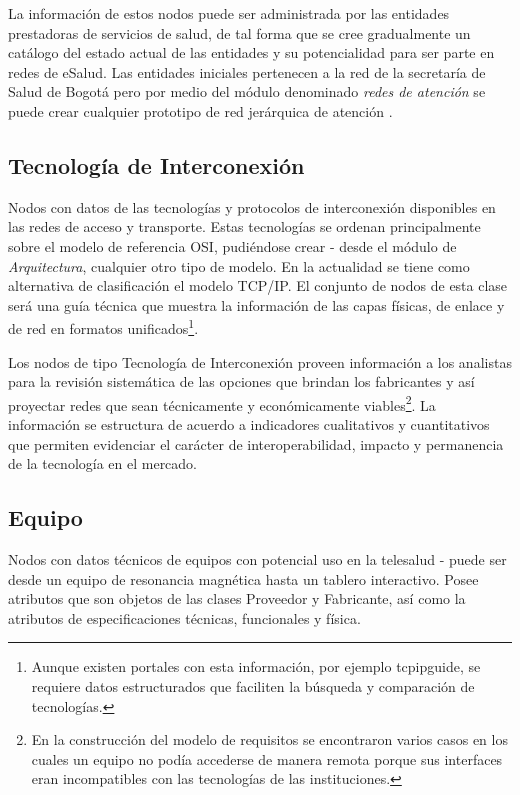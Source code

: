 La información de estos nodos puede ser administrada por las entidades prestadoras de servicios de salud, de tal forma que se cree gradualmente un catálogo del estado actual de las entidades y su potencialidad para ser parte en redes de eSalud. Las entidades iniciales pertenecen a la red de la secretaría de Salud de Bogotá pero por medio del módulo denominado \textit{redes de atención} se puede crear cualquier prototipo de red jerárquica de atención \cite{yellowlees}.

\subsection{Tecnología de Interconexión} 
Nodos con datos de las tecnologías y protocolos de interconexión disponibles en las redes de acceso y transporte. Estas tecnologías se ordenan principalmente sobre el modelo de referencia OSI, pudiéndose crear  - desde el módulo de \textit{Arquitectura}, cualquier otro tipo de modelo. En la actualidad se tiene como alternativa de clasificación el modelo TCP/IP. El conjunto de nodos de esta clase será una guía técnica que muestra la información de las capas físicas, de enlace y de red en formatos unificados\footnote{Aunque existen portales con esta información, por ejemplo tcpipguide, se requiere datos estructurados que faciliten la búsqueda y comparación de tecnologías.}.

Los nodos de tipo Tecnología de Interconexión proveen información a los analistas para la revisión sistemática de las opciones que brindan los fabricantes y así proyectar redes que sean técnicamente y económicamente viables\footnote{En la construcción del modelo de requisitos se encontraron varios casos en los cuales un equipo no podía accederse de manera remota porque sus interfaces eran incompatibles con las tecnologías de las instituciones.}. La información se estructura de acuerdo a indicadores cualitativos y cuantitativos que permiten evidenciar el carácter de interoperabilidad, impacto y permanencia de la tecnología en el mercado. 

\subsection{Equipo}
Nodos con datos técnicos de equipos con potencial uso en la telesalud - puede ser desde un equipo de resonancia magnética hasta un tablero interactivo. Posee atributos que son objetos de las clases Proveedor y Fabricante, así como la atributos de especificaciones técnicas, funcionales y física.

